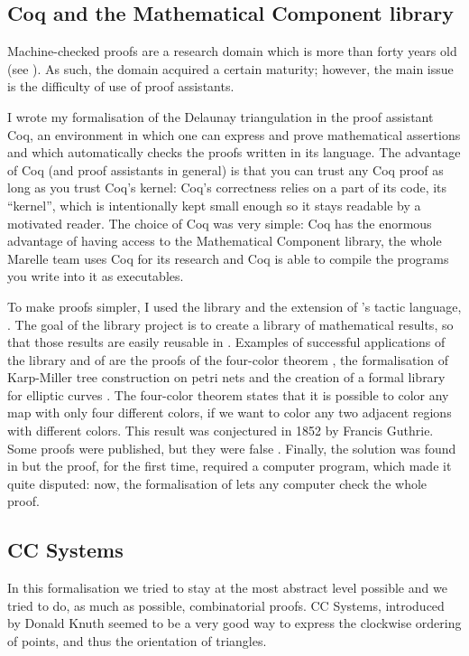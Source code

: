\documentclass[a4paper,10pt]{article}
\begin{document}
\subsection{Coq and the Mathematical Component library}

Machine-checked proofs are a research domain which is more than forty years old (see \cite{Automath}). As such, the domain acquired a certain maturity; however, the main issue is the difficulty of use of proof assistants.

I wrote my formalisation of the Delaunay triangulation in the proof assistant {\sc Coq}, an environment in which one can express and prove mathematical assertions and which automatically checks the proofs written in its language. The advantage of {\sc Coq} (and proof assistants in general) is that you can trust any {\sc Coq} proof as long as you trust {\sc Coq}'s kernel: {\sc Coq}'s correctness relies on a part of its code, its ``kernel'', which is intentionally kept small enough so it stays readable by a motivated reader. The choice of {\sc Coq} was very simple: {\sc Coq} has the enormous advantage of having access to the {\sc Mathematical Component} library, the whole Marelle team uses {\sc Coq} for its research and {\sc Coq} is able to compile the programs you write into it as executables.

To make proofs simpler, I used the {} library and the extension of {}'s tactic language, {}. The goal of the {} library project is to create a library of mathematical results, so that those results are easily reusable in {}. Examples of successful applications of the {} library and of {} are the proofs of the four-color theorem \cite{Gonthier08}, the formalisation of Karp-Miller tree construction on petri nets \cite{petri} and the creation of a formal library for elliptic curves \cite{elliptic}. The four-color theorem states that it is possible to color any map with only four different colors, if we want to color any two adjacent regions with different colors. This result was conjectured in 1852 by Francis Guthrie. Some proofs were published, but they were false \cite{falseproof}. Finally, the solution was found in \cite{proof4} but the proof, for the first time, required a computer program, which made it quite disputed: now, the formalisation of \cite{Gonthier08} lets any computer check the whole proof.

\subsection{CC Systems}
\label{CC}
In this formalisation we tried to stay at the most abstract level possible and we tried to do, as much as possible, combinatorial proofs. CC Systems, introduced by Donald Knuth \cite{Knuth92} seemed to be a very good way to express the clockwise ordering of points, and thus the orientation of triangles.
\end{document}
